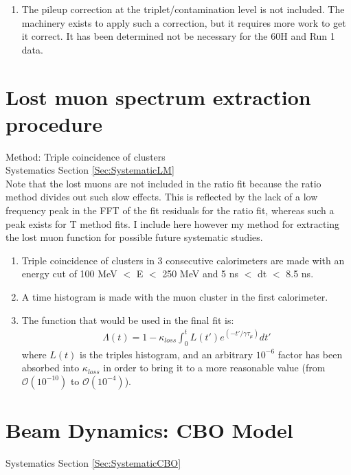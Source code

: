 \begin{enumerate}
		\item{The pileup correction at the triplet/contamination level is not included. The machinery exists to apply such a correction, but it requires more work to get it correct. It has been determined not be necessary for the 60H and Run 1 data.}
	\end{enumerate}


\section{Lost muon spectrum extraction procedure}
\label{Sec:LM}

	Method: Triple coincidence of clusters \\
	\noindent Systematics Section \ref{Sec:SystematicLM} \\

	Note that the lost muons are not included in the ratio fit because the ratio method divides out such slow effects. This is reflected by the lack of a low frequency peak in the FFT of the fit residuals for the ratio fit, whereas such a peak exists for T method fits. I include here however my method for extracting the lost muon function for possible future systematic studies.

	\begin{enumerate}
		\item{Triple coincidence of clusters in 3 consecutive calorimeters are made with an energy cut of 100 MeV $<$ E $<$ 250 MeV and 5 ns $<$ dt $<$ 8.5 ns.}
		\item{A time histogram is made with the muon cluster in the first calorimeter.}
		\item{The function that would be used in the final fit is:
			\begin{gather}
				\Lambda(t) = 1 - \kappa_{loss} \int_{0}^{t} L(t')e^{(-t'/\gamma\tau_{\mu})} dt'
			\end{gather}
		where $L(t)$ is the triples histogram, and an arbitrary $10^{-6}$ factor has been absorbed into $\kappa_{loss}$ in order to bring it to a more reasonable value (from $\mathcal{O}(10^{-10})$ to $\mathcal{O}(10^{-4})$).}
	\end{enumerate}


\section{Beam Dynamics: CBO Model}
\label{Sec:CBO}

	\noindent Systematics Section \ref{Sec:SystematicCBO}

